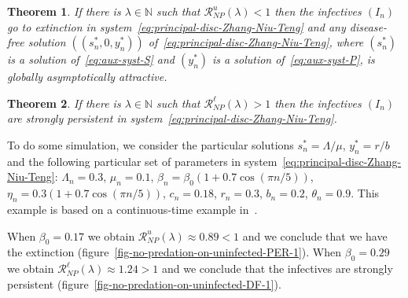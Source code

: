 \documentclass[reqno]{amsart}
\newtheorem{theorem}{Theorem}
\newcommand{\cR}{\mathcal R}
\newcommand{\N}{\ensuremath{\mathds N}}
\begin{document}
{{\begin{theorem}\label{teo:Main-ext-Zhang-Niu-Teng}
If there is $\lambda \in \N$ such that $\cR_{NP}^u(\lambda)<1$ then the infectives $(I_n)$ go to extinction in system~\eqref{eq:principal-disc-Zhang-Niu-Teng} and any disease-free solution $((s^*_n,0,y^*_n))$ of~\eqref{eq:principal-disc-Zhang-Niu-Teng}, where $(s^*_n)$ is a solution of~\eqref{eq:aux-syst-S} and $(y^*_n)$ is a solution of~\eqref{eq:aux-syst-P}, is globally asymptotically attractive.
\end{theorem}

\begin{theorem}\label{teo:Main-ext-Zhang-Niu-Teng}
If there is $\lambda \in \N$ such that $\cR_{NP}^\ell(\lambda)>1$ then the infectives $(I_n)$ are strongly persistent in system~\eqref{eq:principal-disc-Zhang-Niu-Teng}.
\end{theorem}

To do some simulation, we consider the particular solutions $s^*_n=\Lambda/\mu$, $y^*_n=r/b$ and the following particular set of parameters in system~\eqref{eq:principal-disc-Zhang-Niu-Teng}: $\Lambda_n=0.3$, $\mu_n=0.1$, $\beta_n=\beta_0(1+0.7\cos(\pi n/5))$, $\eta_n=0.3(1+0.7\cos(\pi n/5))$, $c_n=0.18$, $r_n=0.3$, $b_n=0.2$, $\theta_n=0.9$. This example is based on a continuous-time example in~\cite{Jesus-Silva-Vilarinho-preprint1-2020}.

When $\beta_0=0.17$ we obtain $\cR_{NP}^u(\lambda)\approx 0.89<1$ and we conclude that we have the extinction (figure~\ref{fig-no-predation-on-uninfected-PER-1}). When $\beta_0=0.29$ we obtain $\cR_{NP}^\ell(\lambda)\approx 1.24>1$ and we conclude that the infectives are strongly persistent (figure~\ref{fig-no-predation-on-uninfected-DF-1}).

}}
\end{document}
